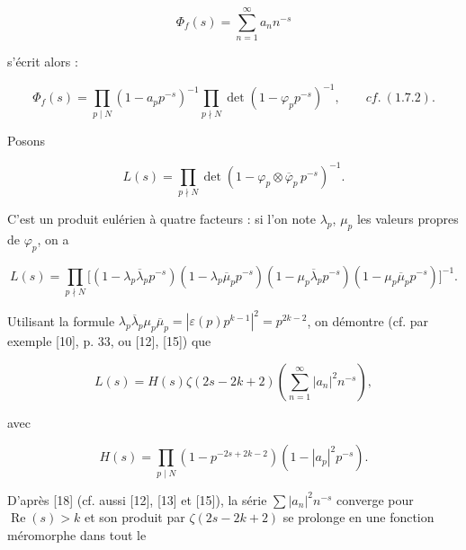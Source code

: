 \documentclass[10pt,oneside]{article}
\begin{document}
\begin{equation*}
\Phi_f(s)=\sum_{n=1}^{\infty}a_nn^{-s}
\end{equation*}

s'écrit alors :\par

\begin{equation*}
\Phi_f(s)=\prod_{p\mid N}(1-a_pp^{-s})^{-1}
\prod_{p\nmid N}\det(1-\varphi_pp^{-s})^{-1},
\qquad cf.\ (1.7.2).
\end{equation*}

Posons\par

\begin{equation*}
L(s)=\prod_{p\nmid N}\det(1-\varphi_p\otimes\overline{\varphi}_p\,p^{-s})^{-1}.
\end{equation*}

C'est un produit eulérien à quatre facteurs : si l'on note \(\lambda_p\), \(\mu_p\) les valeurs propres de \(\varphi_p\), on a\par

\begin{equation*}
L(s)=\prod_{p\nmid N}
\bigl[(1-\lambda_p\overline{\lambda}_pp^{-s})
(1-\lambda_p\overline{\mu}_pp^{-s})
(1-\mu_p\overline{\lambda}_pp^{-s})
(1-\mu_p\overline{\mu}_pp^{-s})\bigr]^{-1}.
\end{equation*}

Utilisant la formule \(\lambda_p\overline{\lambda}_p\mu_p\overline{\mu}_p=|\varepsilon(p)p^{k-1}|^2=p^{2k-2}\), on démontre (cf. par exemple [10], p. 33, ou [12], [15]) que\par

\begin{equation*}
L(s)=H(s)\zeta(2s-2k+2)\left(\sum_{n=1}^{\infty}|a_n|^2n^{-s}\right),
\end{equation*}

avec\par

\begin{equation*}
H(s)=\prod_{p\mid N}(1-p^{-2s+2k-2})(1-|a_p|^2p^{-s}).
\end{equation*}

D'après [18] (cf. aussi [12], [13] et [15]), la série \(\sum|a_n|^2n^{-s}\) converge pour \(\operatorname{Re}(s)>k\) et son produit par \(\zeta(2s-2k+2)\) se prolonge en une fonction méromorphe dans tout le\par

\newpage

\end{document}
